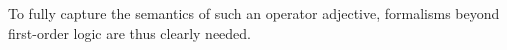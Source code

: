 \documentclass[11pt]{article}
\begin{document}
To fully capture the semantics of such an operator adjective, formalisms beyond first-order logic are thus clearly needed.

%
%
%
%
%
\end{document}
